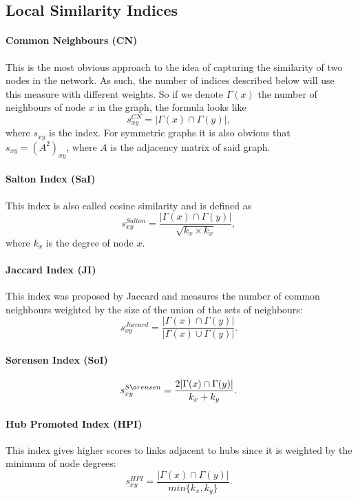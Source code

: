 \documentclass{llncs}
\begin{document}
\subsection{Local Similarity Indices}
%
\paragraph{Common Neighbours (CN)}
%
This is the most obvious approach to the idea of capturing the similarity of two nodes in the network. As such, the number of indices described below will use this measure with different weights. So if we denote $\Gamma(x)$ the number of neighbours of node $x$ in the graph, the formula looks like
\begin{equation}
s_{xy}^{CN} = |\Gamma(x) \cap \Gamma(y)|,
\end{equation}
where $s_{xy}$ is the index. For symmetric graphs it is also obvious that $s_{xy} = (A^2)_{xy}$, where $A$ is the adjacency matrix of said graph.
%
\paragraph{Salton Index (SaI) \cite{salton-index}}
%
This index is also called cosine similarity and is defined as
\begin{equation}
s_{xy}^{Salton} = \frac{|\Gamma(x) \cap \Gamma(y)|}{\sqrt{k_x \times k_x}},
\end{equation}
where $k_x$ is the degree of node $x$.
%
\paragraph{Jaccard Index (JI) \cite{jaccard-index}}
%
This index was proposed by Jaccard and measures the number of common neighbours weighted by the size of the union of the sets of neighbours:
\begin{equation}
s_{xy}^{Jaccard} = \frac{|\Gamma(x) \cap \Gamma(y)|}{|\Gamma(x) \cup \Gamma(y)|}.
\end{equation}
%
\paragraph{S{\o}rensen Index (SoI) \cite{sorensen-index}}
%
\begin{equation}
s_{xy}^{S{\o}rensen} = \frac{2|\Gamma(x) \cap \Gamma(y)|}{k_x + k_y}.
\end{equation}
%
\paragraph{Hub Promoted Index (HPI) \cite{hub-index}}
%
This index gives higher scores to links adjacent to hubs since it is weighted by the minimum of node degrees:
\begin{equation}
s_{xy}^{HPI} = \frac{|\Gamma(x) \cap \Gamma(y)|}{min\{k_x, k_y\}}.
\end{equation}
%
\end{document}

